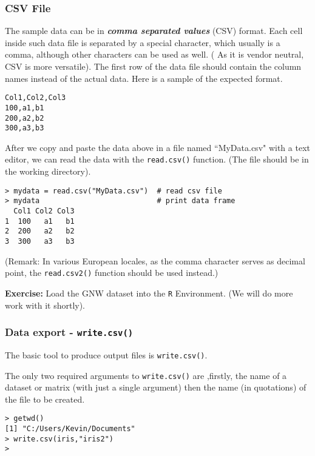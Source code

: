 \documentclass[a4paper,12pt]{article}
\begin{document}

\subsubsection{CSV File}
The sample data can be in \textit{\textbf{comma separated values}} (CSV) format. Each cell inside such data file is separated by a special character, which usually is a comma, although other characters can be used as well. ( As it is vendor neutral, CSV is more versatile).
The first row of the data file should contain the column names instead of the actual data. Here is a sample of the expected format.
\begin{verbatim}
Col1,Col2,Col3
100,a1,b1
200,a2,b2
300,a3,b3
\end{verbatim}

After we copy and paste the data above in a file named ``MyData.csv" with a text editor, we can read the data with the \texttt{read.csv()} function. (The file should be in the working directory).
\begin{verbatim}
> mydata = read.csv("MyData.csv")  # read csv file
> mydata                           # print data frame
  Col1 Col2 Col3
1  100   a1   b1
2  200   a2   b2
3  300   a3   b3
\end{verbatim}
(Remark: In various European locales, as the comma character serves as decimal point, the \texttt{read.csv2()} function should be used instead.)

\bigskip
\noindent \textbf{Exercise:} Load the GNW dataset into the \texttt{R} Environment. (We will do more work with it shortly).

\subsubsection{Data export - \texttt{write.csv()}}
The basic tool to produce output files is \texttt{write.csv()}.

The only two required arguments to \texttt{write.csv()} are ,firstly, the name of a dataset or matrix (with just a single argument) then the name (in quotations) of the file to be created.

\begin{framed}
\begin{verbatim}
> getwd()
[1] "C:/Users/Kevin/Documents"
> write.csv(iris,"iris2")
> 
\end{verbatim}
\end{framed}
\end{document}
